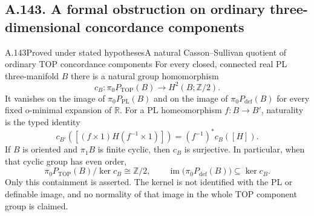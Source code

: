 \subsection{A.143. A formal obstruction on ordinary three-dimensional concordance components}

\begin{saresult}{A.143}{Proved under stated hypotheses}{A natural Casson--Sullivan quotient of ordinary TOP concordance components}
For every closed, connected real PL three-manifold $B$ there is a
natural group homomorphism
\[
 c_B:\pi_0P_{\mathrm{TOP}}(B)\longrightarrow H^2(B;\mathbb Z/2).
                                                        \tag{C3.1}
\]
It vanishes on the image of $\pi_0P_{\mathrm{PL}}(B)$ and on the image
of $\pi_0P_{\mathrm{def}}(B)$ for every fixed o-minimal expansion of
$\mathbb R$. For a PL homeomorphism $f:B\to B'$, naturality is the typed identity
\[
 c_{B'}([(f\times1)H(f^{-1}\times1)])
       =(f^{-1})^*c_B([H]).
                                                        \tag{C3.1a}
\] If $B$ is
oriented and $\pi_1B$ is finite cyclic, then $c_B$ is surjective.
In particular, when that cyclic group has even order,
\[
 \pi_0P_{\mathrm{TOP}}(B)/\ker c_B\cong\mathbb Z/2,
 \qquad
 \operatorname{im}\bigl(\pi_0P_{\mathrm{def}}(B)\bigr)
       \subseteq\ker c_B.
                                                        \tag{C3.2}
\]
Only this containment is asserted. The kernel is not identified with
the PL or definable image, and no normality of that image in the whole
TOP component group is claimed.
\end{saresult}
